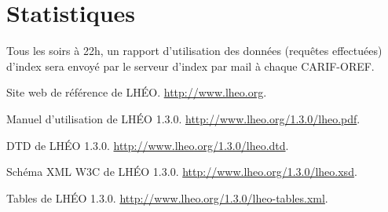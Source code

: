 \documentclass[a4paper]{report}
\begin{document}
\section{Statistiques}

Tous les soirs à 22h, un rapport d'utilisation des données (requêtes
effectuées) d'index sera envoyé par le serveur d'index par mail à
chaque CARIF-OREF.

\begin{thebibliography}{1}
 {Site web de référence de LHÉO}.
  \newblock \url{http://www.lheo.org}.

 {Manuel d'utilisation de LHÉO 1.3.0}.
  \newblock \url{http://www.lheo.org/1.3.0/lheo.pdf}.

 {DTD de LHÉO 1.3.0}.
  \newblock \url{http://www.lheo.org/1.3.0/lheo.dtd}.

 {Schéma XML W3C de LHÉO 1.3.0}.
  \newblock \url{http://www.lheo.org/1.3.0/lheo.xsd}.

 {Tables de LHÉO 1.3.0}.
  \newblock \url{http://www.lheo.org/1.3.0/lheo-tables.xml}.
\end{thebibliography}
\end{document}
